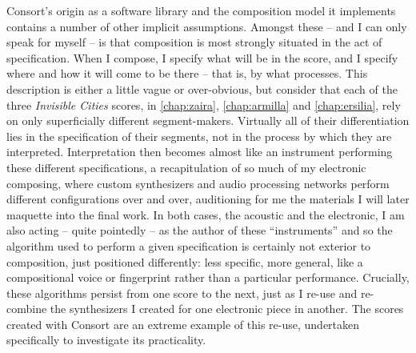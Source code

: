 Consort's origin as a software library and the composition model it implements
contains a number of other implicit assumptions. Amongst these -- and 
I can only speak for myself -- is that composition is most strongly situated in
the act of specification. When I compose, I specify what will be in the score,
and I specify where and how it will come to be there -- that is, by what
processes. This description is either a little vague or over-obvious, but
consider that each of the three \emph{Invisible Cities} scores, in
\autoref{chap:zaira}, \autoref{chap:armilla} and \autoref{chap:ersilia}, rely
on only superficially different segment-makers. Virtually all of their
differentiation lies in the specification of their segments, not in the process
by which they are interpreted. Interpretation then becomes almost like an
instrument performing these different specifications, a recapitulation of so
much of my electronic composing, where custom synthesizers and audio processing
networks perform different configurations over and over, auditioning for me the
materials I will later maquette into the final work. In both cases, the
acoustic and the electronic, I am also acting -- quite pointedly -- as the
author of these \enquote{instruments} and so the algorithm used to perform a
given specification is certainly not exterior to composition, just positioned
differently: less specific, more general, like a compositional voice or
fingerprint rather than a particular performance. Crucially, these algorithms
persist from one score to the next, just as I re-use and re-combine the
synthesizers I created for one electronic piece in another. The scores created
with Consort are an extreme example of this re-use, undertaken specifically to
investigate its practicality.

